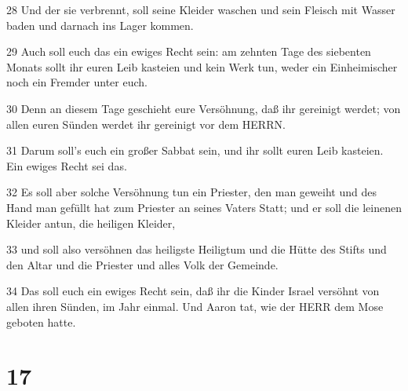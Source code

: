 \par 28 Und der sie verbrennt, soll seine Kleider waschen und sein Fleisch mit Wasser baden und darnach ins Lager kommen.
\par 29 Auch soll euch das ein ewiges Recht sein: am zehnten Tage des siebenten Monats sollt ihr euren Leib kasteien und kein Werk tun, weder ein Einheimischer noch ein Fremder unter euch.
\par 30 Denn an diesem Tage geschieht eure Versöhnung, daß ihr gereinigt werdet; von allen euren Sünden werdet ihr gereinigt vor dem HERRN.
\par 31 Darum soll's euch ein großer Sabbat sein, und ihr sollt euren Leib kasteien. Ein ewiges Recht sei das.
\par 32 Es soll aber solche Versöhnung tun ein Priester, den man geweiht und des Hand man gefüllt hat zum Priester an seines Vaters Statt; und er soll die leinenen Kleider antun, die heiligen Kleider,
\par 33 und soll also versöhnen das heiligste Heiligtum und die Hütte des Stifts und den Altar und die Priester und alles Volk der Gemeinde.
\par 34 Das soll euch ein ewiges Recht sein, daß ihr die Kinder Israel versöhnt von allen ihren Sünden, im Jahr einmal. Und Aaron tat, wie der HERR dem Mose geboten hatte.

\chapter{17}

